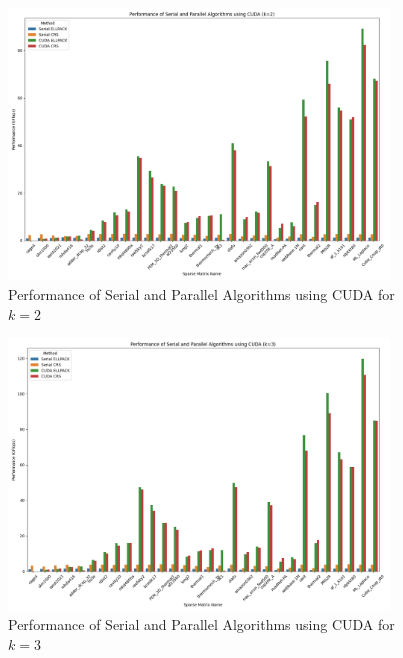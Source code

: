 \documentclass[12pt,oneside]{book} %
\begin{document}
\begin{figure}[H]
    \centering
    \includegraphics[width=0.9\textwidth]{../results/images/CUDA_Performance_k2.png}
    \caption{Performance of Serial and Parallel Algorithms using CUDA for $k=2$}
    \label{fig:cuda-performance-k2}
\end{figure}

\begin{figure}[H]
    \centering
    \includegraphics[width=0.9\textwidth]{../results/images/CUDA_Performance_k3.png}
    \caption{Performance of Serial and Parallel Algorithms using CUDA for $k=3$}
    \label{fig:cuda-performance-k3}
\end{figure}
\end{document}
